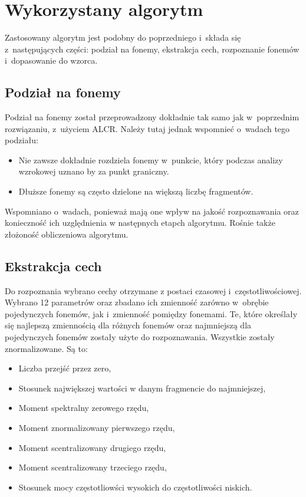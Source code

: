 \chapter{Wykorzystany algorytm}
\label{cha:algorytm}

Zastosowany algorytm jest podobny do poprzedniego i~składa się z~następujących części: podział na fonemy, ekstrakcja cech, rozpoznanie fonemów i~dopasowanie do wzorca.

\section{Podział na fonemy}
\label{sec:podzial}

Podział na fonemy został przeprowadzony dokładnie tak samo jak w~poprzednim rozwiązaniu, z~użyciem ALCR. Należy tutaj jednak wspomnieć o~wadach tego podziału:
\begin{itemize}
    \item Nie zawsze dokładnie rozdziela fonemy w~punkcie, który podczas analizy wzrokowej uznano by za punkt graniczny.
    \item Dłuższe fonemy są często dzielone na większą liczbę fragmentów.
\end{itemize}

Wspomniano o~wadach, ponieważ mają one wpływ na jakość rozpoznawania oraz konieczność ich uzględnienia w następnych etapch algorytmu. Rośnie także złożoność obliczeniowa algorytmu.

\section{Ekstrakcja cech}
\label{sec:ekstrakcja}
Do rozpoznania wybrano cechy otrzymane z postaci czasowej i~częstotliwościowej. Wybrano 12 parametrów oraz zbadano ich zmienność zarówno w~obrębie pojedynczych fonemów, jak i~zmienność pomiędzy fonemami. Te, które określały się najlepszą zmiennością dla różnych fonemów oraz najmniejszą dla pojedynczych fonemów zostały użyte do rozpoznawania. Wszystkie zostały znormalizowane. Są to:
\begin{itemize}
    \item Liczba przejść przez zero,
    \item Stosunek największej wartości w danym fragmencie do najmniejszej,
    \item Moment spektralny zerowego rzędu,
    \item Moment znormalizowany pierwszego rzędu,
    \item Moment scentralizowany drugiego rzędu,
    \item Moment scentralizowany trzeciego rzędu,
    \item Stosunek mocy częstotliowści wysokich do częstotliwości niskich.
\end{itemize}

